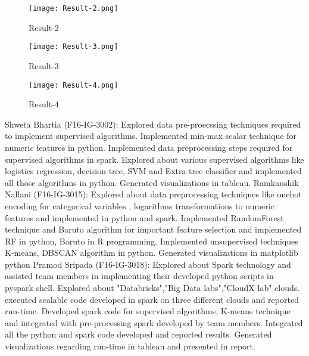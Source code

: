 \documentclass{acm_proc_article-sp}
\begin{document}
\begin{figure}[h]
\texttt{[image: Result-2.png]}
\centering
\caption{Result-2}
\label{Result-2}
\end{figure}

\begin{figure}[h]
\texttt{[image: Result-3.png]}
\centering
\caption{Result-3}
\label{Result-3}
\end{figure}

\begin{figure}[h]
\texttt{[image: Result-4.png]}
\centering
\caption{Result-4}
\label{Result-4}
\end{figure}

\appendix
Shweta Bhartia (F16-IG-3002): Explored data pre-proecssing techniques required to implement supervised algorithms. Implemented min-max scalar technique for numeric features in python.
Implemented data preprocessing steps required for supervised algorithms in spark.
Explored about various supervised algorithms like logistics regression, decision tree, SVM and Extra-tree classifier and implemented all those algorithms in python.
Generated visualizations in tableau.
Ramkaushik Nallani (F16-IG-3015): Explored about data preprocessing techniques like onehot encoding for categorical variables , logarithms transformations to numeric features and implemented in python and spark.
Implemented RandomForest technique and Baruto algorithm for important feature selection and implemented RF in python, Baruto in R programming.
Implemented unsupervised techniques K-means, DBSCAN algorithm in python.
Generated visualizations in matplotlib python
Pramod Sripada (F16-IG-3018): Explored about Spark technology and assisted team members in implementing their developed python scripts in pyspark shell. 
Explored about "Databricks","Big Data labs","CloudX lab" clouds. 
executed scalable code developed in spark on three different clouds and reported run-time.  
Developed spark code for supervised algorithms, K-means technique and integrated with pre-processing spark developed by team members.
Integrated all the python and spark code developed and reported results.
Generated visualizations regarding run-time in tableau and presented in report.



\end{document}
